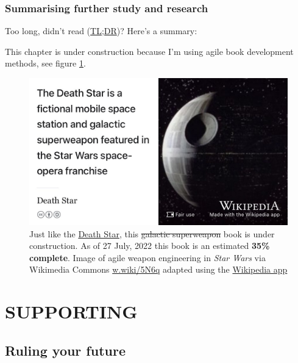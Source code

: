 \documentclass[
]{book}
\begin{document}
\hypertarget{tldr12}{%
\section{Summarising further study and research}\label{tldr12}}

Too long, didn't read (\href{https://en.wiktionary.org/wiki/too_long;_didn\%27t_read}{TL;DR})? Here's a summary:

This chapter is under construction because I'm using agile book development methods, see figure \ref{fig:deathstar9-fig}.

\begin{figure}

{\centering \includegraphics[width=0.99\linewidth]{images/DeathStar2} 

}

\caption{Just like the \href{https://en.wikipedia.org/wiki/Death_Star}{Death Star}, this \sout{galactic superweapon} book is under construction. As of 27 July, 2022 this book is an estimated \textbf{35\% complete}. Image of agile weapon engineering in \emph{Star Wars} via Wikimedia Commons \href{https://w.wiki/5N6q}{w.wiki/5N6q} adapted using the \href{https://apps.apple.com/gb/app/wikipedia/id324715238}{Wikipedia app}}\label{fig:deathstar9-fig}
\end{figure}

\hypertarget{part-supporting}{%
\part{SUPPORTING}\label{part-supporting}}

\hypertarget{ruling}{%
\chapter{Ruling your future}\label{ruling}}
\end{document}
